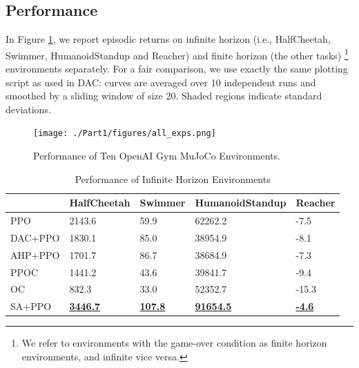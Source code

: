 \subsection{Performance}
In Figure \ref{fig:all_tasks}, we report episodic returns on
infinite horizon (i.e., HalfCheetah, Swimmer, HumanoidStandup and
Reacher) and finite horizon (the other tasks) \footnote{We refer
  to environments with the game-over condition as finite horizon
  environments, and infinite vice versa.} environments
separately. For a fair comparison, we use exactly the same
plotting script as used in DAC: curves are averaged over 10
independent runs and smoothed by a sliding window of size 20.
Shaded regions indicate standard deviations.
\begin{figure}[h]
  \centering
  \texttt{[image: ./Part1/figures/all\_exps.png]}\\
  \caption{\label{fig:all_tasks} Performance of Ten OpenAI Gym
    MuJoCo Environments.}
\end{figure}
\clearpage
\begin{table}[]
\caption{Performance of Infinite Horizon Environments}
\label{table:single_infinite}
\vskip 0.15in
\begin{center}
\begin{tabular}{|l|l|l|l|l|}
\hline
        & HalfCheetah        & Swimmer           & HumanoidStandup     & Reacher          \\ \hline
PPO     & 2143.6                & 59.9                 & 62262.2                & -7.5                \\ \hline
DAC+PPO & 1830.1                & 85.0                 & 38954.9                & -8.1                \\ \hline
AHP+PPO & 1701.7                & 86.7                 & 38684.9                & -7.3                \\ \hline
PPOC    & 1441.2                & 43.6                 & 39841.7                & -9.4                \\ \hline
OC      & 832.3                 & 33.0                 & 52352.7                & -15.3               \\ \hline
SA+PPO  & {\ul \textbf{3446.7}} & {\ul \textbf{107.8}} & {\ul \textbf{91654.5}} & {\ul \textbf{-4.6}} \\ \hline
\end{tabular}
\end{center}
\vskip -0.1in
\end{table}

